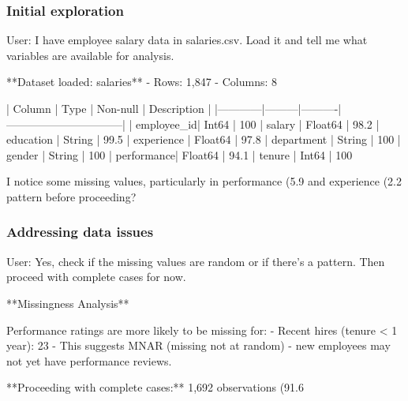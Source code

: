 \subsubsection{Initial exploration}

\begin{Sinput}
User: I have employee salary data in salaries.csv. Load it and tell me
      what variables are available for analysis.
\end{Sinput}

\begin{Soutput}
**Dataset loaded: salaries**
- Rows: 1,847
- Columns: 8

| Column     | Type    | Non-null | Description                    |
|------------|---------|----------|--------------------------------|
| employee_id| Int64   | 100%
| salary     | Float64 | 98.2%
| education  | String  | 99.5%
| experience | Float64 | 97.8%
| department | String  | 100%
| gender     | String  | 100%
| performance| Float64 | 94.1%
| tenure     | Int64   | 100%

I notice some missing values, particularly in performance (5.9%
and experience (2.2%
pattern before proceeding?
\end{Soutput}

\subsubsection{Addressing data issues}

\begin{Sinput}
User: Yes, check if the missing values are random or if there's a pattern.
      Then proceed with complete cases for now.
\end{Sinput}

\begin{Soutput}
**Missingness Analysis**

Performance ratings are more likely to be missing for:
- Recent hires (tenure < 1 year): 23%
- This suggests MNAR (missing not at random) - new employees may not
  yet have performance reviews.

**Proceeding with complete cases:** 1,692 observations (91.6%
\end{Soutput}

